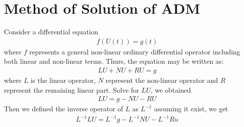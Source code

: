 \documentclass[11pt]{report}
\begin{document}
	\section{Method of Solution of ADM}
	Consider a differential equation
	\begin{eqnarray}
		f(U(t)) = g(t)
	\end{eqnarray}
	where $f$ represents a general non-linear ordinary differential operator including both linear and non-linear terms. Thurs, the equation may be written as:
	\begin{eqnarray}
		LU + NU + RU = g
	\end{eqnarray}
	where $L$ is the linear operator, $N$ represent the non-linear operator and $R$ represent the remaining linear part. Solve for $LU$, we obtained
	\begin{eqnarray}
		LU = g - NU - RU
	\end{eqnarray}
	Then we defined the inverse operator of $L$ as $L^{-1}$ assuming it exist, we get
	\begin{eqnarray}
		L^{-1}LU =L^{-1}g - L^{-1}NU - L^{-1}Ru \label{eq:3_5}
	\end{eqnarray}
	
\end{document}
